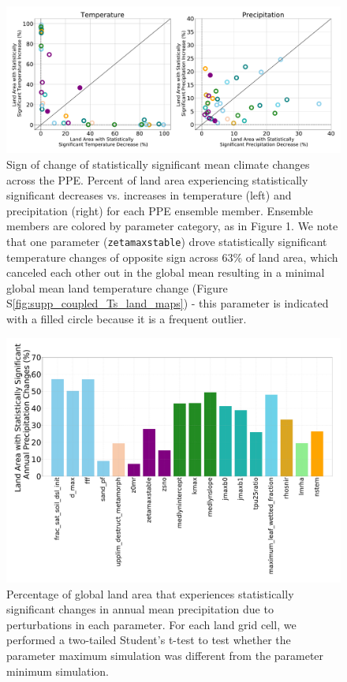 \documentclass[draft, grl]{agujournal2019}
\begin{document}
\begin{figure}[htb!]
\noindent\includegraphics[width=\textwidth]{writing/figs/Figure_S9_Percentage_Significant_Sign_Change.pdf}
\caption{Sign of change of statistically significant mean climate changes across the PPE. Percent of land area experiencing statistically significant decreases vs. increases in temperature (left) and precipitation (right) for each PPE ensemble member. Ensemble members are colored by parameter category, as in Figure 1. We note that one parameter (\texttt{zetamaxstable}) drove statistically significant temperature changes of opposite sign across 63$\%$ of land area, which canceled each other out in the global mean resulting in a minimal global mean land temperature change (Figure S\ref{fig:supp_coupled_Ts_land_maps}) - this parameter is indicated with a filled circle because it is a frequent outlier.}
\label{fig:supp_pct_stat_sig}
\end{figure}

\begin{figure}[htb!]
\noindent\includegraphics[width=\textwidth]{writing/figs/Figure_S_Precip_Change_Significance_by_Parameter.pdf}
\caption{Percentage of global land area that experiences statistically significant changes in annual mean precipitation due to perturbations in each parameter. For each land grid cell, we performed a two-tailed Student’s t-test to test whether the parameter maximum simulation was different from the parameter minimum simulation.}
\label{fig:supp_precip_significance_changes}
\end{figure}
\end{document}

